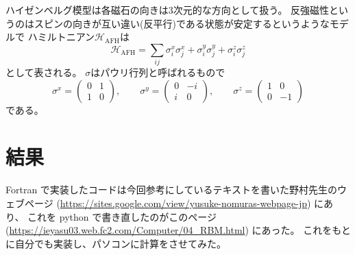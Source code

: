 \documentclass[twocolumn,10pt,dvipdfmx,a4paper]{jsarticle}
\begin{document}
ハイゼンベルグ模型は各磁石の向きは3次元的な方向として扱う。
反強磁性というのはスピンの向きが互い違い(反平行)である状態が安定するというようなモデルで
ハミルトニアン\(\mathcal{H}_{\text{AFH}}\)は
\begin{equation}
    \mathcal{H}_{\text{AFH}} = \sum_{ij} \sigma_i^x\sigma_j^x + \sigma_i^y\sigma_j^y+ \sigma_i^z\sigma_j^z
\end{equation}
として表される。
\(\sigma\)はパウリ行列と呼ばれるもので
\begin{equation}
    \sigma^x = \begin{pmatrix}
        0 & 1\\
        1 & 0
    \end{pmatrix}, \qquad
    \sigma^y = \begin{pmatrix}
        0 & -i\\
        i & 0
    \end{pmatrix}, \qquad
    \sigma^z = \begin{pmatrix}
        1 & 0\\
        0 & -1
    \end{pmatrix}
\end{equation}
である。

\newpage
\section{結果}
Fortran で実装したコードは今回参考にしているテキスト\cite{SGC191}を書いた野村先生のウェブページ
(\url{https://sites.google.com/view/yusuke-nomuras-webpage-jp})
にあり、
これを python で書き直したのがこのページ(\url{https://ieyasu03.web.fc2.com/Computer/04_RBM.html})
にあった。
これをもとに自分でも実装し、パソコンに計算をさせてみた。




\end{document}
